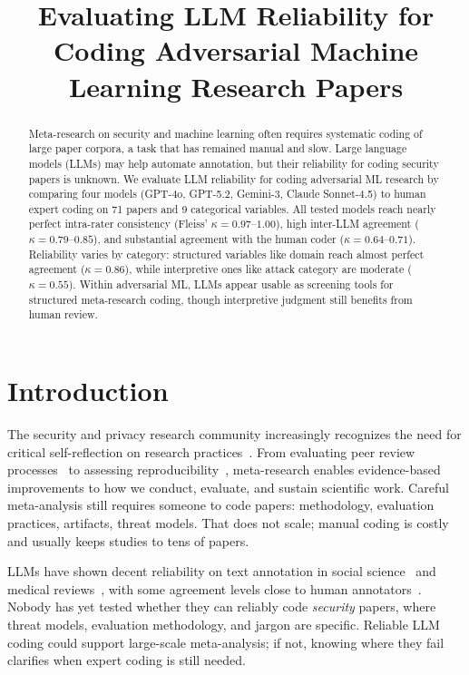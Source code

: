 \documentclass[conference,compsoc]{IEEEtran}
\begin{document}
\title{Evaluating LLM Reliability for Coding Adversarial Machine Learning Research Papers}


\maketitle

\begin{abstract}
Meta-research on security and machine learning often requires systematic coding of large paper corpora, a task that has remained manual and slow. Large language models (LLMs) may help automate annotation, but their reliability for coding security papers is unknown. We evaluate LLM reliability for coding adversarial ML research by comparing four models (GPT-4o, GPT-5.2, Gemini-3, Claude Sonnet-4.5) to human expert coding on 71 papers and 9 categorical variables. All tested models reach nearly perfect intra-rater consistency (Fleiss' $\kappa = 0.97$--$1.00$), high inter-LLM agreement ($\kappa = 0.79$--$0.85$), and substantial agreement with the human coder ($\kappa = 0.64$--$0.71$). Reliability varies by category: structured variables like domain reach almost perfect agreement ($\kappa = 0.86$), while interpretive ones like attack category are moderate ($\kappa = 0.55$). Within adversarial ML, LLMs appear usable as screening tools for structured meta-research coding, though interpretive judgment still benefits from human review.
\end{abstract}

\section{Introduction}

The security and privacy research community increasingly recognizes the need for critical self-reflection on research practices~\cite{metacrisp2026,rossow2012prudent,baset2019analyzing}. From evaluating peer review processes~\cite{soneji2024reflecting} to assessing reproducibility~\cite{olszewski2023reproducibility}, meta-research enables evidence-based improvements to how we conduct, evaluate, and sustain scientific work. Careful meta-analysis still requires someone to code papers: methodology, evaluation practices, artifacts, threat models. That does not scale; manual coding is costly and usually keeps studies to tens of papers.

LLMs have shown decent reliability on text annotation in social science~\cite{gilardi2023chatgpt,tornberg2024chatgpt} and medical reviews~\cite{gartlehner2025ai}, with some agreement levels close to human annotators~\cite{rathje2024gpt}. Nobody has yet tested whether they can reliably code \emph{security} papers, where threat models, evaluation methodology, and jargon are specific. Reliable LLM coding could support large-scale meta-analysis; if not, knowing where they fail clarifies when expert coding is still needed.
\end{document}
